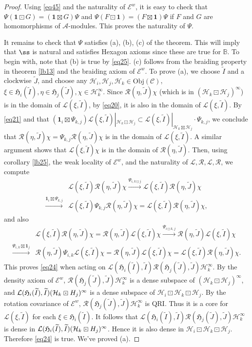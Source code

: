 \documentclass[11pt,b5paper,notitlepage]{article}
\theoremstyle{definition}
\theoremstyle{plain}
\newcommand{\fk}{\mathfrak}
\newcommand{\mc}{\mathcal}
\newcommand{\wtd}{\widetilde}
\newcommand{\id}{\mathbf{1}}
\newcommand{\scr}{\mathscr}
\newcommand{\mbb}{\mathbb}
\newcommand{\Obj}{\mathrm{Obj}}
\numberwithin{equation}{subsection}
\begin{document}
\begin{proof}
Using \eqref{eq45} and the naturality of $\scr E^w$, it is easy to check that $\Psi(\id\boxdot G)=(\id\boxtimes G)\Psi$ and $\Psi(F\boxdot\id)=(F\boxtimes\id)\Psi$ if $F$ and $G$ are homomorphisms of $\mc A$-modules. This proves the naturality of $\Psi$.

It remains to check that $\Psi$ satisfies (a), (b), (c) of the theorem. This will imply that  $\ss$ is natural and satisfies Hexagon axioms since these are true for $\mbb B$. To begin with, note that (b) is true by \eqref{eq25}. (c) follows from the braiding property in theorem \ref{lb13} and the braiding axiom of $\scr E^w$. To prove (a), we  choose  $\wtd I$ and a clockwise $\wtd J$, and choose any $\mc H_i,\mc H_j,\mc H_k\in\Obj(\scr C)$, $\xi\in\fk H_i(\wtd I),\eta\in\fk H_j(\wtd J),\chi\in\mc H_k^\infty$. Since $\mc R(\eta,\wtd J)\chi$ (which is in $(\mc H_k\boxdot\mc H_j)^\infty$) is in the domain of $\mc L(\xi,\wtd I)$, by \eqref{eq20}, it is also in the domain of $\scr L(\xi,\wtd I)$. By \eqref{eq21} and that $(\id_i\boxtimes\Psi_{k,j})\scr L(\xi,\wtd I)|_{\mc H_k\boxdot\mc H_j}\subset\scr L(\xi,\wtd I)|_{\mc H_k\boxtimes\mc H_j}\cdot\Psi_{k,j}$, we conclude that  $\scr R(\eta,\wtd J)\chi=\Psi_{k,j}\mc R(\eta,\wtd J)\chi$ is in the domain of  $\scr L(\xi,\wtd I)$. A similar argument shows that $\scr L(\xi,\wtd I)\chi$ is in the domain of $\scr R(\eta,\wtd J)$. Then, using corollary \ref{lb25}, the weak locality of $\scr E^w$, and the naturality of $\mc L,\mc R,\scr L,\scr R$, we compute
\begin{align*}
&\mc L(\xi,\wtd I)\mc R(\eta,\wtd J)\chi\xrightarrow{\Psi_{i,k\boxdot j}} \scr L(\xi,\wtd I)\mc R(\eta,\wtd J)\chi\\
\xrightarrow{\id_i\boxtimes\Psi_{k,j}}&\scr L(\xi,\wtd I)\Psi_{k,j}\mc R(\eta,\wtd J)\chi=\scr L(\xi,\wtd I)\scr R(\eta,\wtd J)\chi ,
\end{align*}
and also
\begin{align*}
&\mc L(\xi,\wtd I)\mc R(\eta,\wtd J)\chi=\mc R(\eta,\wtd J)\mc L(\xi,\wtd I)\chi \xrightarrow{\Psi_{i\boxdot k,j}} \scr R(\eta,\wtd J)\mc L(\xi,\wtd I)\chi\\
\xrightarrow{\Psi_{i,k}\boxtimes\id_j}&\scr R(\eta,\wtd J)\Psi_{i,k}\mc L(\xi,\wtd I)\chi =  \scr R(\eta,\wtd J)\scr L(\xi,\wtd I)\chi=\scr L(\xi,\wtd I)\scr R(\eta,\wtd J)\chi.
\end{align*}
This proves \eqref{eq24} when acting on $\mc L(\fk H_i(\wtd I),\wtd I)\mc R(\fk H_j(\wtd J),\wtd J)\mc H_k^\infty$. By the density axiom of $\scr E^w$, $\mc R(\fk H_j(\wtd J),\wtd J)\mc H_k^\infty$ is a dense subspace of $(\mc H_k\boxdot\mc H_j)^\infty$, and $\mc L(\fk H_i(\wtd I),\wtd I)(\mc H_k\boxdot\mc \mc H_j)^\infty$ is a dense subspace of $\mc H_i\boxdot\mc H_k\boxdot\mc H_j$. By the rotation covariance of $\scr E^w$, $\mc R(\fk H_j(\wtd J),\wtd J)\mc H_k^\infty$ is QRI. Thus it is a core for $\mc L(\xi,\wtd I)$ for each $\xi\in\fk H_i(\wtd I)$. It follows that $\mc L(\fk H_i(\wtd I),\wtd I)\mc R(\fk H_j(\wtd J),\wtd J)\mc H_k^\infty$ is dense in $\mc L(\fk H_i(\wtd I),\wtd I)(\mc H_k\boxdot\mc \mc H_j)^\infty$. Hence it is also dense in $\mc H_i\boxdot\mc H_k\boxdot\mc H_j$. Therefore \eqref{eq24} is true. We've proved (a).
\end{proof}
\end{document}
